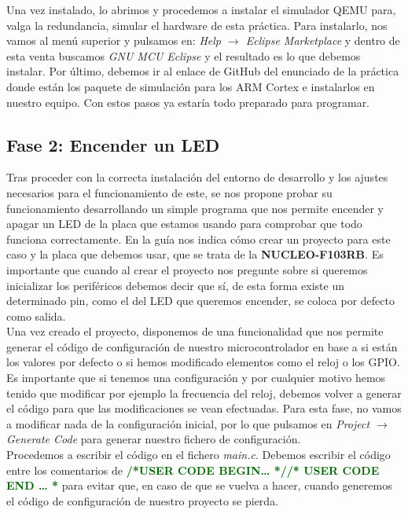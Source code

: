 \documentclass[11pt,a4paper]{article}
\begin{document}
	Una vez instalado, lo abrimos y procedemos a instalar el simulador QEMU para, valga la redundancia, simular el hardware de esta práctica. Para instalarlo, nos vamos al menú superior y pulsamos en: \textit{Help $\rightarrow$ Eclipse Marketplace} y dentro de esta venta buscamos \textit{GNU MCU Eclipse} y el resultado es lo que debemos instalar. Por último, debemos ir al enlace de GitHub del enunciado de la práctica donde están los paquete de simulación para los ARM Cortex e instalarlos en nuestro equipo. Con estos pasos ya estaría todo preparado para programar.
	
	\subsection{Fase 2: Encender un LED}
	Tras proceder con la correcta instalación del entorno de desarrollo y los ajustes necesarios para el funcionamiento de este, se nos propone probar su funcionamiento desarrollando un simple programa que nos permite encender y apagar un LED de la placa que estamos usando para comprobar que todo funciona correctamente. En la guía nos indica cómo crear un proyecto para este caso y la placa que debemos usar, que se trata de la \textbf{NUCLEO-F103RB}. Es importante que cuando al crear el proyecto nos pregunte sobre si queremos inicializar los periféricos debemos decir que sí, de esta forma existe un determinado pin, como el del LED que queremos encender, se coloca por defecto como salida.\\
	
	Una vez creado el proyecto, disponemos de una funcionalidad que nos permite generar el código de configuración de nuestro microcontrolador en base a si están los valores por defecto o si hemos modificado elementos como el reloj o los GPIO. Es importante que si tenemos una configuración y por cualquier motivo hemos tenido que modificar por ejemplo la frecuencia del reloj, debemos volver a generar el código para que las modificaciones se vean efectuadas. Para esta fase, no vamos a modificar nada de la configuración inicial, por lo que pulsamos en \textit{Project $\rightarrow$ Generate Code} para generar nuestro fichero de configuración.\\
	
	Procedemos a escribir el código en el fichero \textit{main.c}. Debemos escribir el código entre los comentarios de \footnotesize\textcolor{DarkGreen}{{\textbf{/*USER CODE BEGIN… *//* USER CODE END … *}}} \large para evitar que, en caso de que se vuelva a hacer, cuando generemos el código de configuración de nuestro proyecto se pierda.\\
	
\end{document}
